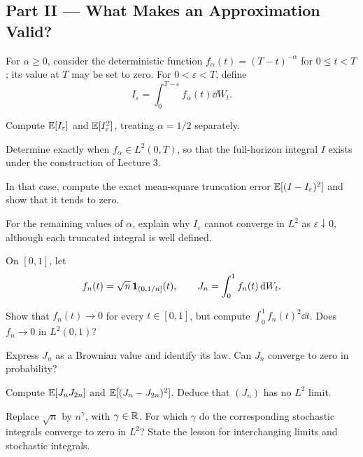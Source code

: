 \clearpage
\subsection*{Part II --- What Makes an Approximation Valid?}

\begin{exercise}
For \(\alpha\geq0\), consider the deterministic function
\(f_\alpha(t)=(T-t)^{-\alpha}\) for \(0\leq t<T\); its value at
\(T\) may be set to zero. For \(0<\varepsilon<T\), define
\[
I_\varepsilon=\int_0^{T-\varepsilon}f_\alpha(t)\dd W_t.
\]
\begin{exparts}
  \item Compute \(\mathbb{E}[I_\varepsilon]\) and
  \(\mathbb{E}[I_\varepsilon^2]\), treating \(\alpha=1/2\) separately.
  \item Determine exactly when \(f_\alpha\in L^2(0,T)\), so that the
  full-horizon integral \(I\) exists under the construction of Lecture 3.
  \item In that case, compute the exact mean-square truncation error
  \(\mathbb{E}[(I-I_\varepsilon)^2]\) and show that it tends to zero.
  \item For the remaining values of \(\alpha\), explain why
  \(I_\varepsilon\) cannot converge in \(L^2\) as
  \(\varepsilon\downarrow0\), although each truncated integral is well defined.
\end{exparts}
\end{exercise}

\begin{exercise}
On \([0,1]\), let
\[
f_n(t)=\sqrt n\,\mathbf{1}_{(0,1/n]}(t),
\qquad
J_n=\int_0^1 f_n(t)\,\mathrm{d} W_t.
\]
\begin{exparts}
  \item Show that \(f_n(t)\to0\) for every \(t\in[0,1]\), but compute
  \(\int_0^1f_n(t)^2\dd t\). Does \(f_n\to0\) in \(L^2(0,1)\)?
  \item Express \(J_n\) as a Brownian value and identify its law.
  Can \(J_n\) converge to zero in probability?
  \item Compute \(\mathbb{E}[J_nJ_{2n}]\) and
  \(\mathbb{E}[(J_n-J_{2n})^2]\). Deduce that \((J_n)\) has no \(L^2\) limit.
  \item Replace \(\sqrt n\) by \(n^\gamma\), with \(\gamma\in\mathbb{R}\).
  For which \(\gamma\) do the corresponding stochastic integrals converge
  to zero in \(L^2\)? State the lesson for interchanging limits and
  stochastic integrals.
\end{exparts}
\end{exercise}

